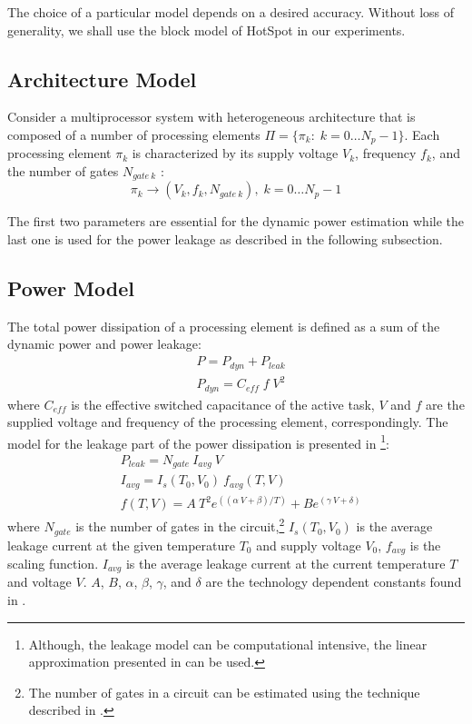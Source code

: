 The choice of a particular model depends on a desired accuracy. Without loss of generality, we shall use the block model of HotSpot in our experiments.

\subsection{Architecture Model}
Consider a multiprocessor system with heterogeneous architecture that is composed of a number of processing elements $\Pi = \{ \pi_k: \; k = 0 \dots N_p - 1 \}$. Each processing element $\pi_k$ is characterized by its supply voltage $V_k$, frequency $f_k$, and the number of gates $N_{gate \: k}$ \cite{liao2005}:
\[
  \pi_k \rightarrow (V_k, f_k, N_{gate \: k}), \; k = 0 \dots N_p - 1
\]

The first two parameters are essential for the dynamic power estimation while the last one is used for the power leakage as described in the following subsection.

\subsection{Power Model}
The total power dissipation of a processing element is defined as a sum of the dynamic power and power leakage:
\begin{align*}
  & P = P_{dyn} + P_{leak} \\
  & P_{dyn} = C_{eff} \; f \; V^2
\end{align*}
where $C_{eff}$ is the effective switched capacitance of the active task, $V$ and $f$ are the supplied voltage and frequency of the processing element, correspondingly. The model for the leakage part of the power dissipation is presented in \cite{liao2005}\footnote{Although, the leakage model can be computational intensive, the linear approximation presented in \cite{liu2007} can be used.}:
\begin{align*}
  & P_{leak} = N_{gate} \: I_{avg} \: V \\
  & I_{avg} = I_s(T_0, V_0) \: f_{avg}(T, V) \\
  & f(T, V) = A \: T^2 e^{((\alpha \: V + \beta)/T)} + B e^{(\gamma \: V + \delta)}
\end{align*}
where $N_{gate}$ is the number of gates in the circuit,\footnote{The number of gates in a circuit can be estimated using the technique described in \cite{li2004}.} $I_s (T_0, V_0)$ is the average leakage current at the given temperature $T_0$ and supply voltage $V_0$, $f_{avg}$ is the scaling function. $I_{avg}$ is the average leakage current at the current temperature $T$ and voltage $V$. $A$, $B$, $\alpha$, $\beta$, $\gamma$, and $\delta$ are the technology dependent constants found in \cite{liao2005}.
